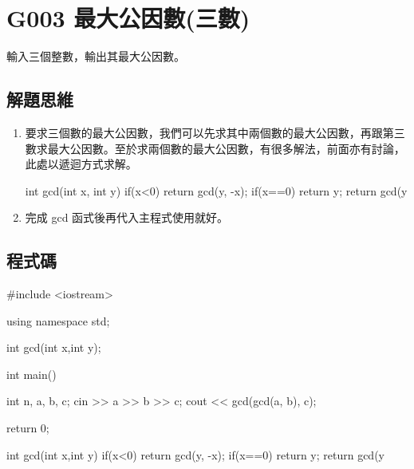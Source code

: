 \section{G003 最大公因數(三數)}
輸入三個整數，輸出其最大公因數。
\subsection{解題思維}

\begin{enumerate}
	\item
	要求三個數的最大公因數，我們可以先求其中兩個數的最大公因數，再跟第三數求最大公因數。至於求兩個數的最大公因數，有很多解法，前面亦有討論，此處以遞迴方式求解。
	\begin{inside}
	int gcd(int x, int y) {
		if(x<0) return gcd(y, -x);
		if(x==0) return y;
		return gcd(y%
	}
	\end{inside}
	
	\item
	完成 gcd 函式後再代入主程式使用就好。
\end{enumerate} 

\subsection{程式碼}
\begin{cppcode}
	#include <iostream>

	using namespace std;
	
	int gcd(int x,int y);
	
	int main()
	{
		int n, a, b, c;
		cin >> a >> b >> c;
		cout << gcd(gcd(a, b), c);
		
		return 0;
	}

	int gcd(int x,int y) {
		if(x<0) return gcd(y, -x);
		if(x==0) return y;
		return gcd(y%
	}
\end{cppcode}
